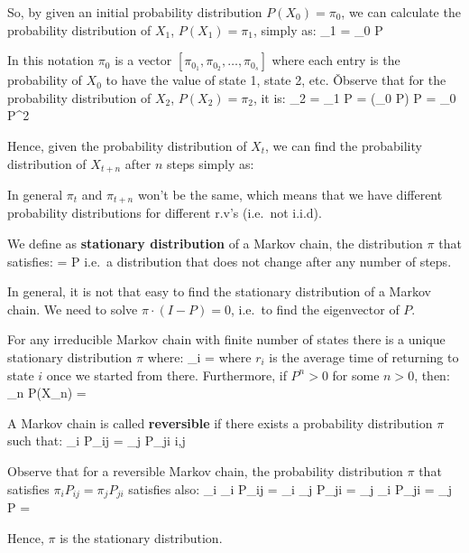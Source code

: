 So, by given an initial probability distribution $P(X_{0}) = \pi_{0}$, we can calculate the probability distribution
of $X_{1}$, $P(X_{1}) = \pi_{1}$, simply as:
\bse
\pi_{1} = \pi_{0} \cdot P
\ese

In this notation $\pi_{0}$ is a vector $[\pi_{0_{1}}, \pi_{0_{2}}, \ldots, \pi_{0_{s}}]$ where each entry is the
probability of $X_{0}$ to have the value of state 1, state 2, etc. \v

Observe that for the probability distribution of $X_{2}$, $P(X_{2}) = \pi_{2}$, it is:
\bse
\pi_{2} = \pi_{1} \cdot P = (\pi_{0} \cdot P) \cdot P = \pi_{0} \cdot P^2
\ese

Hence, given the probability distribution of $X_{t}$, we can find the probability distribution of $X_{t+n}$ after
$n$ steps simply as:
\bse
{}
\ese

In general $\pi_{t}$ and $\pi_{t+n}$ won't be the same, which means that we have different probability
distributions for different r.v's (i.e.\ not i.i.d).

We define as \textbf{stationary distribution} of a Markov chain, the distribution $\pi$ that satisfies:
\bse
\pi = \pi \cdot P
\ese
i.e.\ a distribution that does not change after any number of steps.
\ed

In general, it is not that easy to find the stationary distribution of a Markov chain. We need to solve
$\pi \cdot (I - P) = 0$, i.e.\ to find the eigenvector of $P$.

For any irreducible Markov chain with finite number of states there is a unique stationary distribution $\pi$ where:
\bse
\pi_{i} = 
\ese
where $r_{i}$ is the average time of returning to state $i$ once we started from there. Furthermore, if $P^{n} > 0$
for some $n > 0$, then:
\bse
\lim_{n \to \infty} P(X_{n}) = \pi
\ese
\et

A Markov chain is called \textbf{reversible} if there exists a probability distribution $\pi$ such that:
\bse
\pi_{i} P_{ij} = \pi_{j} P_{ji} \quad \forall i,j
\ese
\ed

Observe that for a reversible Markov chain, the probability distribution $\pi$ that satisfies $\pi_{i} P_{ij} =
\pi_{j} P_{ji}$ satisfies also:
\bse
\sum_{i} \pi_{i} P_{ij} = \sum_{i} \pi_{j} P_{ji} = \pi_{j} \sum_{i} P_{ji} = \pi_{j}
\quad \Rightarrow \quad \pi \cdot P = \pi
\ese

Hence, $\pi$ is the stationary distribution.

